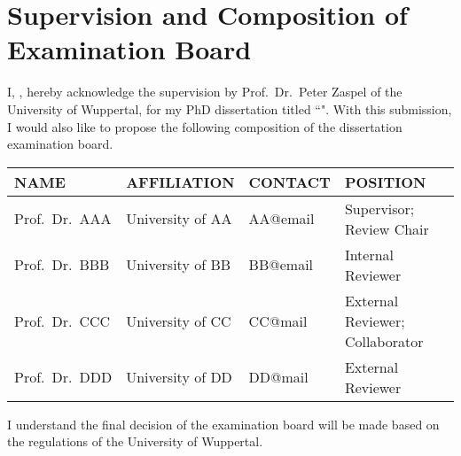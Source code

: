 \documentclass[a4paper,12pt,leqno,openbib]{memoir}
\begin{document}
{}

\chapter*{Supervision and Composition of Examination Board}

I, \utsname, hereby acknowledge the supervision by Prof.~Dr.~Peter Zaspel of the University of Wuppertal, for my PhD dissertation titled ``\utstitle". With this submission, I would also like to propose the following composition of the dissertation examination board. 

\begin{center}
    \begin{tabular}{|p{3cm}|p{2.75cm}|l|p{2cm}|}
         \hline
         NAME & AFFILIATION & CONTACT & POSITION \\
         \hline\hline
         
         Prof.~Dr.~AAA & University of AA & AA@email & Supervisor; Review Chair \\
         \hline 
         
         Prof.~Dr.~BBB & University of BB & BB@email & Internal Reviewer \\
         \hline
         
         Prof.~Dr.~CCC & University of CC & CC@mail & External Reviewer; Collaborator \\
         \hline
         
         Prof.~Dr.~DDD & University of DD & DD@mail & External Reviewer \\
         \hline
    \end{tabular}
\end{center}

I understand the final decision of the examination board will be made based on the regulations of the University of Wuppertal. 


\vspace{2cm}
\noindent
{}
\end{document}
